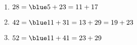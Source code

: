    \ \\ [-5mm]
   \begin{enumerate}
      \item $28 ={\blue 5+23 =11+17}$ \smallskip
      \item $42 ={\blue 11+31 =13+29 =19+23}$ \smallskip
      \item $52 ={\blue 11+41 = 23+29}$
   \end{enumerate}
